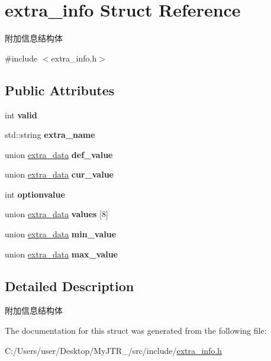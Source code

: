 \hypertarget{structextra__info}{}\section{extra\+\_\+info Struct Reference}
\label{structextra__info}


附加信息结构体  




{\ttfamily \#include $<$extra\+\_\+info.\+h$>$}

\subsection*{Public Attributes}
\begin{DoxyCompactItemize}
\item 
\mbox{\label{structextra__info_a690f6a0a796ec4b1bfcf45d94ba3409e}} 
int {\bfseries valid}
\item 
\mbox{\label{structextra__info_ab94139e9ec1831eea1627fee9fb06d28}} 
std\+::string {\bfseries extra\+\_\+name}
\item 
\mbox{\label{structextra__info_a01025845c14614f1cc4e527bbec63897}} 
union \mbox{\hyperlink{unionextra__data}{extra\+\_\+data}} {\bfseries def\+\_\+value}
\item 
\mbox{\label{structextra__info_a224e2546d81d2249fce529dbec22c1a1}} 
union \mbox{\hyperlink{unionextra__data}{extra\+\_\+data}} {\bfseries cur\+\_\+value}
\item 
\mbox{\label{structextra__info_a19000bc26a6138a6211df110fffcaaa9}} 
int {\bfseries optionvalue}
\item 
\mbox{\label{structextra__info_a8d970b8ccf41203e64e6d6ffc7cc91e1}} 
union \mbox{\hyperlink{unionextra__data}{extra\+\_\+data}} {\bfseries values} \mbox{[}8\mbox{]}
\item 
\mbox{\label{structextra__info_a239d9c41f9be243371e82ab565c81a99}} 
union \mbox{\hyperlink{unionextra__data}{extra\+\_\+data}} {\bfseries min\+\_\+value}
\item 
\mbox{\label{structextra__info_a0cf116733445a6f4653749072b3eb540}} 
union \mbox{\hyperlink{unionextra__data}{extra\+\_\+data}} {\bfseries max\+\_\+value}
\end{DoxyCompactItemize}


\subsection{Detailed Description}
附加信息结构体 

The documentation for this struct was generated from the following file\+:\begin{DoxyCompactItemize}
\item 
C\+:/\+Users/user/\+Desktop/\+My\+J\+T\+R\+\_/src/include/\mbox{\hyperlink{extra__info_8h}{extra\+\_\+info.\+h}}\end{DoxyCompactItemize}
